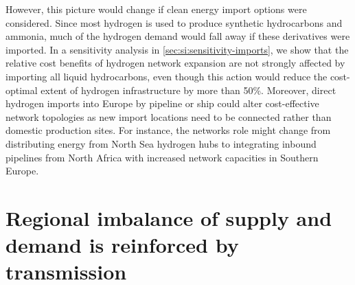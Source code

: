 However, this picture would change if clean energy import options were
considered. Since most hydrogen is used to produce synthetic hydrocarbons and
ammonia, much of the hydrogen demand would fall away if these derivatives were
imported. In a sensitivity analysis in \cref{sec:si:sensitivity-imports}, we
show that the relative cost benefits of hydrogen network expansion are not
strongly affected by importing all liquid hydrocarbons, even though this action
would reduce the cost-optimal extent of hydrogen infrastructure by more than
50\%. Moreover, direct hydrogen imports into Europe by pipeline or ship could
alter cost-effective network topologies as new import locations need to be
connected rather than domestic production sites. For instance, the networks role
might change from distributing energy from North Sea hydrogen hubs to
integrating inbound pipelines from North Africa with increased network
capacities in Southern Europe.\cite{wetzelGreenEnergy2022}

\section*{Regional imbalance of supply and demand is reinforced by transmission}
\label{sec:imbalance}

